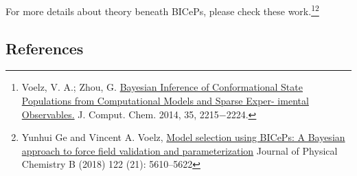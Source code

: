For more details about theory beneath BICePs, please check these
work.\footnote{Voelz, V. A.; Zhou, G.
  \href{https://onlinelibrary.wiley.com/doi/abs/10.1002/jcc.23738}{Bayesian
  Inference of Conformational State Populations from Computational
  Models and Sparse Exper- imental Observables.} J. Comput. Chem. 2014,
  35, 2215−2224.}\footnote{Yunhui Ge and Vincent A. Voelz,
  \href{https://pubs.acs.org/doi/10.1021/acs.jpcb.7b11871}{Model
  selection using BICePs: A Bayesian approach to force field validation
  and parameterization} Journal of Physical Chemistry B (2018) 122 (21):
  5610--5622}

\hypertarget{references}{%
\subsection{References}\label{references}}

